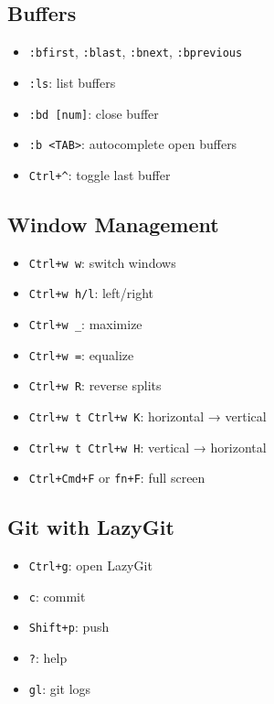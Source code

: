\documentclass[
  letterpaper,
  DIV=11,
  numbers=noendperiod]{scrartcl}
\providecommand{\tightlist}{%
  \setlength{\itemsep}{0pt}\setlength{\parskip}{0pt}}\usepackage{longtable,booktabs,array}
\begin{document}
\subsection{Buffers}\label{buffers}

\begin{itemize}
\tightlist
\item
  \texttt{:bfirst}, \texttt{:blast}, \texttt{:bnext},
  \texttt{:bprevious}
\item
  \texttt{:ls}: list buffers
\item
  \texttt{:bd\ {[}num{]}}: close buffer
\item
  \texttt{:b\ \textless{}TAB\textgreater{}}: autocomplete open buffers
\item
  \texttt{Ctrl+\^{}}: toggle last buffer
\end{itemize}

\subsection{Window Management}\label{window-management}

\begin{itemize}
\tightlist
\item
  \texttt{Ctrl+w\ w}: switch windows
\item
  \texttt{Ctrl+w\ h/l}: left/right
\item
  \texttt{Ctrl+w\ \_}: maximize
\item
  \texttt{Ctrl+w\ =}: equalize
\item
  \texttt{Ctrl+w\ R}: reverse splits
\item
  \texttt{Ctrl+w\ t\ Ctrl+w\ K}: horizontal → vertical
\item
  \texttt{Ctrl+w\ t\ Ctrl+w\ H}: vertical → horizontal
\item
  \texttt{Ctrl+Cmd+F} or \texttt{fn+F}: full screen
\end{itemize}

\subsection{Git with LazyGit}\label{git-with-lazygit}

\begin{itemize}
\tightlist
\item
  \texttt{Ctrl+g}: open LazyGit
\item
  \texttt{c}: commit
\item
  \texttt{Shift+p}: push
\item
  \texttt{?}: help
\item
  \texttt{gl}: git logs
\end{itemize}
\end{document}
